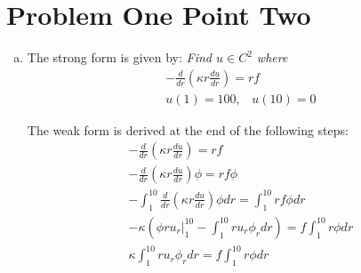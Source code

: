 \documentclass[11pt]{article}
\newcommand{\rint}[1]{\int_1^{10} #1 dr}
\begin{document}
\section*{Problem One Point Two}
\begin{enumerate}[(a)]
\item 
The strong form is given by:
\emph{Find $u\in C^2$ where}
\begin{gather*}
-\frac{d}{dr}(\kappa r\frac{du}{dr}) = rf\\
u(1) = 100,\;\;\; u(10) = 0
\end{gather*}

The weak form is derived at the end of the following steps:
\begin{gather*}
-\frac{d}{dr}(\kappa r\frac{du}{dr}) = rf\\
-\frac{d}{dr}(\kappa r\frac{du}{dr})\phi = rf\phi\\
-\rint{\frac{d}{dr}(\kappa r\frac{du}{dr})\phi} = \rint{rf\phi}\\
-\kappa\left(\phi r u_r\Big|_1^{10} - \rint{ru_r\phi_r}\right) = f\rint{r\phi}\\
\kappa\rint{ru_r\phi_r} = f\rint{r\phi}
\end{gather*}


\end{enumerate}
\end{document}
